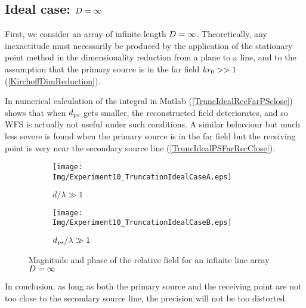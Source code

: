 \subsection{Ideal case: $D=\infty$}
First, we consider an array of infinite length $D=\infty$.
Theoretically, any inexactitude must necessarily be produced by the application of the stationary point method in the dimensionality reduction from a plane to a line, and to the assumption that the primary source is in the far field $kr_0 >> 1$ (\autoref{KirchoffDimReduction}).

In numerical calculation of the integral in Matlab (\autoref{TruncIdealRecFarPSclose}) shows that when $d_{\PosTheoSubInd[primarySource]}$ gets smaller, the reconstructed field deteriorates, and so WFS is actually not useful under such conditions. A similar behaviour but much less severe is found when the primary source is in the far field but the receiving point is very near the secondary source line (\autoref{TruncIdealPSFarRecClose}).
\begin{figure}[h]
	\centering
	\begin{subfigure}[b]{0.49\textwidth}
		\centering
		\texttt{[image: Img/Experiment10\_TruncationIdealCaseA.eps]}
		\caption{$d/\lambda \gg 1$}
		\label{TruncIdealRecFarPSclose}
	\end{subfigure}
	\begin{subfigure}[b]{0.49\textwidth}
		\centering
		\texttt{[image: Img/Experiment10\_TruncationIdealCaseB.eps]}
		\caption{$d_{\PosTheoSubInd[primarySource]}/\lambda \gg 1$}
		\label{TruncIdealPSFarRecClose}
	\end{subfigure}
	\caption{Magnitude and phase of the relative field for an infinite line array $D = \infty$}
\end{figure}
In conclusion, as long as both the primary source and the receiving point are not too close to the secondary source line, the precision will not be too distorted.

